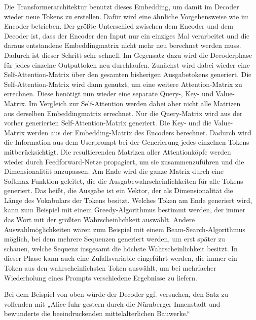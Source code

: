 Die Transformerarchitektur benutzt dieses Embedding, um damit im Decoder wieder neue Tokens zu erstellen.
Dafür wird eine ähnliche Vorgehensweise wie im Encoder betrieben.
Der größte Unterschied zwischen dem Encoder und dem Decoder ist, dass der Encoder den Input nur ein einziges Mal verarbeitet und die daraus entstandene Embeddingmatrix nicht mehr neu berechnet werden muss.
Dadurch ist dieser Schritt sehr schnell.
Im Gegensatz dazu wird die Decoderphase für jedes einzelne Outputtoken neu durchlaufen.
Zunächst wird dabei wieder eine Self-Attention-Matrix über den gesamten bisherigen Ausgabetokens generiert.
Die Self-Attention-Matrix wird dann genutzt, um eine weitere Attention-Matrix zu errechnen.
Diese benötigt nun wieder eine separate Query-, Key- und Value-Matrix.
Im Vergleich zur Self-Attention werden dabei aber nicht alle Matrizen aus derselben Embeddingmatrix errechnet.
Nur die Query-Matrix wird aus der vorher generierten Self-Attention-Matrix generiert.
Die Key- und die Value-Matrix werden aus der Embedding-Matrix des Encoders berechnet.
Dadurch wird die Information aus dem Userprompt bei der Generierung jedes einzelnen Tokens mitberücksichtigt.
Die resultierenden Matrizen aller Attentionköpfe werden wieder durch Feedforward-Netze propagiert, um sie zusammenzuführen und die Dimensionalität anzupassen.
Am Ende wird die ganze Matrix durch eine Softmax-Funktion geleitet, die die Ausgabewahrscheinlichkeiten für alle Tokens generiert.
Das heißt, die Ausgabe ist ein Vektor, der als Dimensionalität die Länge des Vokabulars der Tokens besitzt.
Welches Token am Ende generiert wird, kann zum Beispiel mit einem Greedy-Algorithmus bestimmt werden, der immer das Wort mit der größten Wahrscheinlichkeit auswählt.
Andere Auswahlmöglichkeiten wären zum Beispiel mit einem Beam-Search-Algorithmus möglich, bei dem mehrere Sequenzen generiert werden, um erst später zu schauen, welche Sequenz insgesamt die höchste Wahrscheinlichkeit besitzt.
In dieser Phase kann auch eine Zufallsvariable eingeführt werden, die immer ein Token aus den wahrscheinlichsten Token auswählt, um bei mehrfacher Wiederholung eines Prompts verschiedene Ergebnisse zu liefern.~\cite{vaswani2023}

Bei dem Beispiel von oben würde der Decoder ggf. versuchen, den Satz zu vollenden mit „Alice fuhr gestern durch die Nürnberger Innenstadt und bewunderte die beeindruckenden mittelalterlichen Bauwerke.“



